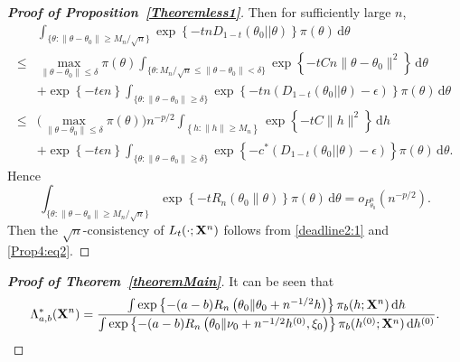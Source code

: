 \documentclass[11pt]{article}
\theoremstyle{plain}
\theoremstyle{definition}
\theoremstyle{remark}
\begin{document}
\begin{appendices}
\begin{proof}[\textbf{Proof of Proposition~\ref{Theoremless1}}]
    Then for sufficiently large $n$,
\begin{align*}
    &
    \int_{\{\theta:\|\theta-\theta_0\|\geq {M_n}/{\sqrt{n}}\} } 
    \exp \left\{  - t n D_{1-t}(\theta_0||\theta)  \right\} \pi(\theta) \, \mathrm d \theta
    \\
    \leq &
    \max_{\|\theta-\theta_0\|\leq \delta}\pi(\theta)
    \int_{\big\{\theta: {M_n}/{\sqrt{n}} \leq \|\theta-\theta_0\| < \delta \big\}}
\exp\left\{  -t C {n} \|\theta-\theta_0\|^2 \right\}
    \, \mathrm d \theta
    \\
    &+
    \exp\left\{ -t\epsilon n\right\}
    \int_{\{\theta:\|\theta-\theta_0\|\geq \delta \} } 
    \exp \left\{  - t n ( D_{1-t}(\theta_0||\theta)  - \epsilon ) \right\} \pi(\theta) \, \mathrm d \theta
    \\
    \leq&
    \big(\max_{\|\theta-\theta_0\|\leq \delta}\pi(\theta)\big)
    n^{-p/2}\int_{ \left\{ h: \|h\| \geq M_n \right\}} \exp\left\{  - t C \|h\|^2 \right\} \, \mathrm d h
    \\
    &+
    \exp\left\{ -t\epsilon n\right\}
    \int_{\{\theta:\|\theta-\theta_0\|\geq \delta \} } 
    \exp \left\{  - c^* ( D_{1-t}(\theta_0||\theta)  - \epsilon ) \right\} \pi(\theta) \, \mathrm d \theta
    .
\end{align*}
Hence
\begin{equation}\label{Prop4:eq2}
    \int_{\{\theta:\|\theta-\theta_0\|\geq {M_n}/{\sqrt{n}}\} } 
    \exp\left\{ -t R_n \left( \theta_0 \| \theta \right) \right\}
    \pi(\theta) \, \mathrm d \theta
    =o_{P^n_{\theta_0}}\left( n^{-p/2} \right).
\end{equation}
Then the $\sqrt{n}$-consistency of $L_t(\cdot;\mathbf{X}^{n})$ follows from \eqref{deadline2:1} and \eqref{Prop4:eq2}.





\end{proof}










\begin{proof}[\textbf{Proof of Theorem~\ref{theoremMain}}]
    It can be seen that
    \begin{equation*}
        \Lambda_{a,b}^* (\mathbf{X}^n)=\frac{
            \int \exp\left\{ - (a-b) R_n \left( \theta_0 \| \theta_0 + n^{-1/2} h \right) \right\} \pi_b (h;\mathbf{X}^{n}) \, \mathrm dh
        }{
            \int \exp\left\{ - (a-b) R_n \left( \theta_0 \| \nu_0 + n^{-1/2} h^{(0)}, \xi_0 \right) \right\} \pi_b (h^{(0)};\mathbf{X}^{n}) \, \mathrm dh^{(0)}
}.
    \end{equation*}



\end{proof}
\end{appendices}
\end{document}
